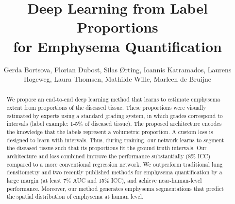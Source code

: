 \documentclass{llncs}
\begin{document}
%
\mainmatter              %
%
\title{Deep Learning from Label Proportions \\
for Emphysema Quantification}
%
%
\author{
Gerda Bortsova,
Florian Dubost,
Silas {\O}rting,
Ioannis Katramados,
Laurens Hogeweg,
Laura Thomsen,
Mathilde Wille,
Marleen de Bruijne
}
%
%
\tocauthor{}
%

\maketitle              %

\begin{abstract}
We propose an end-to-end deep learning method that learns to estimate emphysema extent from proportions of the diseased tissue.
These proportions were visually estimated by experts using a standard grading system, in which grades correspond to intervals (label example: 1-5\% of diseased tissue).
The proposed architecture encodes the knowledge that the labels represent a volumetric proportion.
A custom loss is designed to learn with intervals.
Thus, during training, our network learns to segment the diseased tissue such that its proportions fit the ground truth intervals.
Our architecture and loss combined improve the performance substantially (8\% ICC) compared to a more conventional regression network.
We outperform traditional lung densitometry and two recently published methods for emphysema quantification by a large margin (at least 7\% AUC and 15\% ICC), and achieve near-human-level performance.
Moreover, our method generates emphysema segmentations that predict the spatial distribution of emphysema at human level.

\end{abstract}
%
\end{document}

